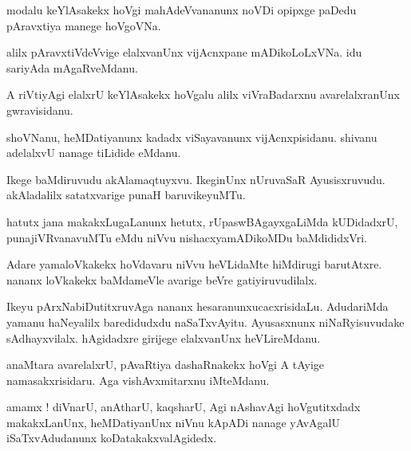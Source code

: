 \documentclass{article}
\begin{document}
\begin{mn}
modalu  keYlAsakekx  hoVgi  mahAdeVvananunx  noVDi  opipxge  paDedu  pAravxtiya  manege  hoVgoVNa.
\end{mn}

\begin{mn}
alilx  pAravxtiVdeVvige  elalxvanUnx  vijAcnxpane  mADikoLoLxVNa.  idu  sariyAda  mAgaRveMdanu.
\end{mn}

\begin{mn}
A  riVtiyAgi  elalxrU  keYlAsakekx  hoVgalu  alilx  viVraBadarxnu  avarelalxranUnx  gwravisidanu.
\end{mn}

\begin{mn}
shoVNanu,  heMDatiyanunx  kadadx  viSayavanunx  vijAcnxpisidanu.  shivanu  adelalxvU  nanage  tiLidide  eMdanu.
\end{mn}

\begin{mn}
Ikege  baMdiruvudu  akAlamaqtuyxvu.  IkeginUnx  nUruvaSaR  Ayusisxruvudu.  akAladalilx  satatxvarige  punaH  baruvikeyuMTu.
\end{mn}

\begin{mn}
hatutx jana  makakxLugaLanunx  hetutx,  rUpaswBAgayxgaLiMda  kUDidadxrU,  punajiVRvanavuMTu  eMdu  niVvu  
nishacxyamADikoMDu  baMdididxVri.
\end{mn}

\begin{mn}
Adare  yamaloVkakekx  hoVdavaru  niVvu  heVLidaMte  hiMdirugi  barutAtxre.  nananx  loVkakekx  baMdameVle  
avarige  beVre  gatiyiruvudilalx.
\end{mn}

\begin{mn}
Ikeyu  pArxNabiDutitxruvAga  nananx  hesaranunxucacxrisidaLu.  AdudariMda  yamanu  haNeyalilx  baredidudxdu  
naSaTxvAyitu.  Ayusasxnunx  niNaRyisuvudake  sAdhayxvilalx.  hAgidadxre  girijege  elalxvanUnx  heVLireMdanu.
\end{mn}

\begin{mn}
anaMtara  avarelalxrU,  pAvaRtiya  dashaRnakekx  hoVgi  A  tAyige  namasakxrisidaru.  Aga  vishAvxmitarxnu  iMteMdanu.
\end{mn}

\begin{mn}
amamx !  diVnarU,  anAtharU,  kaqsharU,  Agi  nAshavAgi  hoVgutitxdadx  makakxLanUnx,  heMDatiyanUnx  
niVnu  kApADi  nanage  yAvAgalU  iSaTxvAdudanunx  koDatakakxvalAgidedx.
\end{mn}
\end{document}
